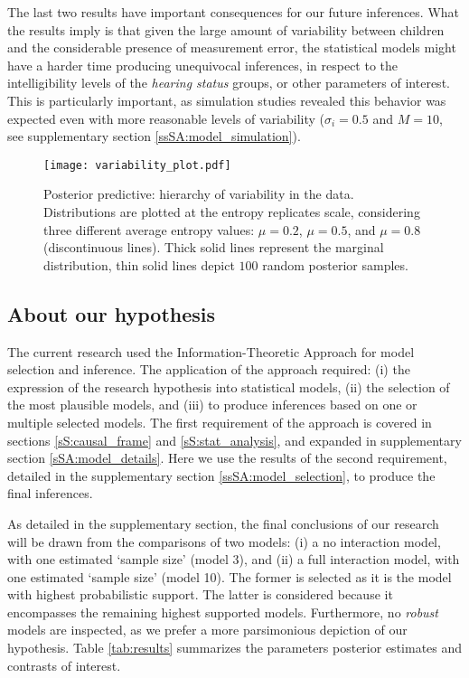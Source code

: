 The last two results have important consequences for our future inferences. What the results imply is that given the large amount of variability between children and the considerable presence of measurement error, the statistical models might have a harder time producing unequivocal inferences, in respect to the intelligibility levels of the \textit{hearing status} groups, or other parameters of interest. This is particularly important, as simulation studies revealed this behavior was expected even with more reasonable levels of variability ($\sigma_{i}=0.5$ and $M=10$, see supplementary section \ref{ssSA:model_simulation}).
%
\begin{figure}[!h]
	\centering
	\texttt{[image: variability\_plot.pdf]}
	\caption[Posterior predictive: hierarchy of variability in the data]{Posterior predictive: hierarchy of variability in the data. Distributions are plotted at the entropy replicates scale, considering three different average entropy values: $\mu=0.2$, $\mu=0.5$, and $\mu=0.8$ (discontinuous lines). Thick solid lines represent the marginal distribution, thin solid lines depict $100$ random posterior samples.}
	\label{fig:variability}
\end{figure}
%
%
\subsection{About our hypothesis} \label{sS:results_hypothesis}
%
The current research used the Information-Theoretic Approach \citep{Anderson_2008, Chamberlain_1965} for model selection and inference. The application of the approach required: (i) the expression of the research hypothesis into statistical models, (ii) the selection of the most plausible models, and (iii) to produce inferences based on one or multiple selected models. The first requirement of the approach is covered in sections \ref{sS:causal_frame} and \ref{sS:stat_analysis}, and expanded in supplementary section \ref{sSA:model_details}. Here we use the results of the second requirement, detailed in the supplementary section \ref{ssSA:model_selection}, to produce the final inferences. 

As detailed in the supplementary section, the final conclusions of our research will be drawn from the comparisons of two models: (i) a no interaction model, with one estimated `sample size' (model 3), and (ii) a full interaction model, with one estimated `sample size' (model 10). The former is selected as it is the model with highest probabilistic support. The latter is considered because it encompasses the remaining highest supported models. Furthermore, no \textit{robust} models are inspected, as we prefer a more parsimonious depiction of our hypothesis. Table \ref{tab:results} summarizes the parameters posterior estimates and contrasts of interest. 

